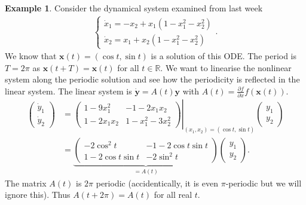 \documentclass[hidelinks,a4paper, 11pt]{article}
\theoremstyle{plain}
\theoremstyle{break}
\theoremstyle{plain}
\theoremstyle{definition}
\newtheorem*{example}{Example}
\begin{document}
{\begin{example}
	Consider the dynamical system examined from last week
	\begin{align}\label{chapter:periodic-solutions-model-example}
		\begin{cases}
		\dot x_1 = -x_2 +x_1(1-x_1^2-x_2^2) \\
		\dot x_2 = x_1 + x_2(1-x_1^2-x_2^2)
		\end{cases}.
	\end{align}
	We know that $\mathbf x(t) = (\cos t, \sin t)$ is a solution of this ODE. The period is $T = 2\pi$ as $\mathbf x(t + T) = \mathbf x(t)$ for all $t \in \mathbb R$. We want to linearise the nonlinear system along the periodic solution and see how the periodicity is reflected in the linear system. The linear system is $\mathbf{\dot y} = A(t) \mathbf y$ with $A(t) = \frac{\partial f}{\partial x}f(\mathbf x(t))$.
	\begin{align*}
		\begin{pmatrix}
			{\dot y_1} \\
			{\dot y_2}
		\end{pmatrix} &= \left.
		\begin{pmatrix}
			1-9x_1^2 & -1-2x_1x_2 \\
			1-2x_1x_2 & 1 - x_1^2-3x_2^2
		\end{pmatrix} \right \vert_{(x_1,x_2) = (\cos t, \sin t)} \begin{pmatrix}
			y_1 \\ y_2
		\end{pmatrix} \\
		&= \underbrace{\begin{pmatrix}
			-2\cos^2t & -1-2\cos t \sin t \\ 
			1-2 \cos t \sin t & -2 \sin^2t
		\end{pmatrix}}_{=A(t)} \begin{pmatrix}
		y_1 \\ y_2
		\end{pmatrix}.
	\end{align*}
	The matrix $A(t) $ is $2\pi$ periodic (accidentically, it is even $\pi$-periodic but we will ignore this). Thus $A(t + 2\pi) = A(t)$ for all real $t$.
	

\end{example}}
\end{document}

